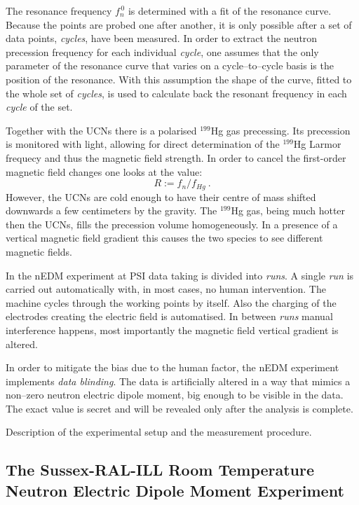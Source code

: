 The resonance frequency $f_n^{\,0}$ is determined with a fit of the resonance curve. Because the points are probed one after another, it is only possible after a set of data points, \emph{cycles}, have been measured. In order to extract the neutron precession frequency for each individual \emph{cycle}, one assumes that the only parameter of the resonance curve that varies on a cycle--to--cycle basis is the position of the resonance. With this assumption the shape of the curve, fitted to the whole set of \emph{cycles}, is used to calculate back the resonant frequency in each \emph{cycle} of the set.

Together with the UCNs there is a polarised $^{199}$Hg gas precessing. Its precession is monitored with light, allowing for direct determination of the $^{199}$Hg Larmor frequecy and thus the magnetic field strength. In order to cancel the first-order magnetic field changes one looks at the value:
\begin{equation}
  R := f_n / f_{Hg} \ .
\end{equation}
However, the UCNs are cold enough to have their centre of mass shifted downwards a few centimeters by the gravity. The $^{199}$Hg gas, being much hotter then the UCNs, fills the precession volume homogeneously. In a presence of a vertical magnetic field gradient this causes the two species to see different magnetic fields.

In the nEDM experiment at PSI data taking is divided into \emph{runs}. A single \emph{run} is carried out automatically with, in most cases, no human intervention. The machine cycles through the working points by itself. Also the charging of the electrodes creating the electric field is automatised. In between \emph{runs} manual interference happens, most importantly the magnetic field vertical gradient is altered.

In order to mitigate the bias due to the human factor, the nEDM experiment implements \emph{data blinding}. The data is artificially altered in a way that mimics a non--zero neutron electric dipole moment, big enough to be visible in the data. The exact value is secret and will be revealed only after the analysis is complete.












Description of the experimental setup and the measurement procedure.

\subsection{The Sussex-RAL-ILL Room Temperature Neutron Electric Dipole Moment Experiment}

